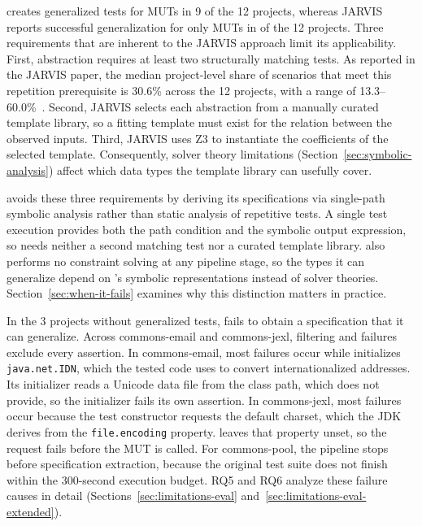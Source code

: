 \ToolTeralizer{} creates generalized tests for
\TzRqzeroBreadthTeralizerTotalSoundMuts{} MUTs in 9 of the 12 projects,
whereas JARVIS reports successful generalization for only
\TzRqzeroBreadthJarvisTotalMuts{} MUTs
in \TzRqzeroBreadthPublishedProjects{} of the 12 projects.
Three requirements that are inherent to the JARVIS approach limit its applicability.
First, abstraction requires at least two structurally matching tests.
As reported in the JARVIS paper, the median project-level share of scenarios
that meet this repetition prerequisite is 30.6\% across the 12 projects,
with a range of 13.3--60.0\%~\cite{peleg_2018_jarvis}.
Second, JARVIS selects each abstraction
from a manually curated template library,
so a fitting template must exist for the relation between the observed inputs.
Third, JARVIS uses Z3 to instantiate the coefficients of the selected template.
Consequently, solver theory limitations (Section~\ref{sec:symbolic-analysis})
affect which data types the template library can usefully cover.

\ToolTeralizer{} avoids these three requirements
by deriving its specifications via single-path symbolic analysis
rather than static analysis of repetitive tests.
A single test execution provides both the path condition
and the symbolic output expression,
so \ToolTeralizer{} needs neither a second matching test
nor a curated template library.
\ToolTeralizer{} also performs no constraint solving at any pipeline stage,
so the types it can generalize depend on \ToolSPF{}'s symbolic representations
instead of solver theories.
Section~\ref{sec:when-it-fails} examines why this distinction matters in practice.

In the 3 projects without generalized tests,
\ToolTeralizer{} fails to obtain a specification that it can generalize.
Across commons-email and commons-jexl,
filtering and \ToolSPF{} failures exclude every assertion.
In commons-email, most failures occur while \ToolSPF{} initializes \texttt{java.net.IDN},
which the tested code uses to convert internationalized addresses.
Its initializer reads a Unicode data file from the class path,
which \ToolSPF{} does not provide, so the initializer fails its own assertion.
In commons-jexl, most failures occur because the test constructor
requests the default charset,
which the JDK derives from the \texttt{file.encoding} property.
\ToolSPF{} leaves that property unset,
so the request fails before the MUT is called.
For commons-pool, the pipeline stops before specification extraction,
because the original test suite does not finish
within the 300-second execution budget.
RQ5 and RQ6 analyze these failure causes in detail
(Sections~\ref{sec:limitations-eval} and~\ref{sec:limitations-eval-extended}).

